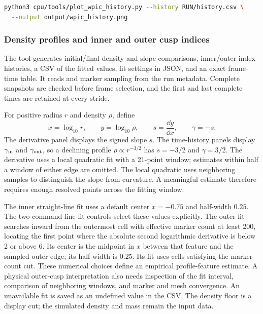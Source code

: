 \begin{lstlisting}[language=bash]
python3 cpu/tools/plot_wpic_history.py --history RUN/history.csv \
  --output output/wpic_history.png
\end{lstlisting}

\subsubsection{Density profiles and inner and outer cusp indices}

The tool
 generates
initial/final density and slope comparisons,
inner/outer index histories, a CSV of the fitted values, fit settings in JSON,
and an exact frame-time table. It reads \code{gamma_i} and marker sampling
from the run metadata. Complete snapshots are checked before frame selection,
and the first and last complete times are retained at every stride.

For positive radius \(r\) and density \(\rho\), define
\[
 x=\log_{10}r,\qquad y=\log_{10}\rho,\qquad
 s=\frac{\dd y}{\dd x},\qquad \gamma=-s.               \tag{WPIC-D3}
\]
The derivative panel displays the signed slope \(s\). The time-history
panels display \(\gamma_{\rm in}\) and \(\gamma_{\rm out}\), so a declining
profile \(\rho\propto r^{-3/2}\) has \(s=-3/2\) and \(\gamma=3/2\).
The derivative uses a local quadratic fit with a 21-point window; estimates
within half a window of either edge are omitted. The local quadratic uses neighboring samples to distinguish the slope from
curvature. A meaningful estimate therefore requires enough resolved points
across the fitting window.

The inner straight-line fit uses a default center \(x=-0.75\) and half-width
\(0.25\). The two command-line fit controls select these values explicitly.
The outer fit searches inward from the outermost cell with effective marker
count at least 200, locating the first point where the absolute second
logarithmic derivative is below 2 or above 6. Its center is the midpoint in
\(x\) between that feature and the sampled outer edge; its half-width is
\(0.25\). Its fit uses cells satisfying the marker-count cut. These numerical
choices define an empirical profile-feature estimate. A physical outer-cusp
interpretation also needs inspection of the fit interval, comparison of
neighboring windows, and marker and mesh convergence. An unavailable fit is
saved as an undefined value in the CSV. The density floor is a display cut;
the simulated density and mass remain the input data.

